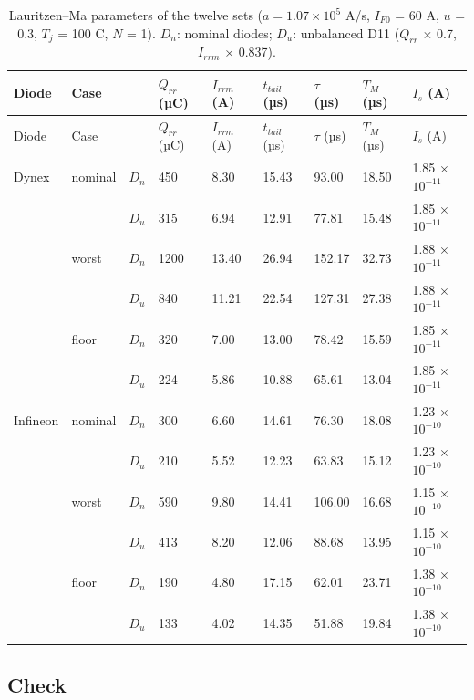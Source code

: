 \documentclass[11pt,a4paper,numbers=noenddot]{scrartcl}
\begin{document}
\begin{onehalfspace}
{\small\singlespacing
\begin{longtable}[]{@{}lllllllll@{}}
\caption{Lauritzen--Ma parameters of the twelve sets (\(a = 1.07 \times 10^5\) A/s, \(I_{F0}\) = 60 A, \(u\) = 0.3, \(T_j\) = 100 \textdegree{}C, \(N\) = 1). \(D_n\): nominal diodes; \(D_u\): unbalanced D11 (\(Q_{rr}\) \(\times\) 0.7, \(I_{rrm}\) \(\times\) 0.837).}\tabularnewline
\toprule\noalign{}
Diode & Case & & \(Q_{rr}\) (µC) & \(I_{rrm}\) (A) & \(t_{tail}\) (µs) & \(\tau\) (µs) & \(T_M\) (µs) & \(I_s\) (A) \\
\midrule\noalign{}
\endfirsthead
\toprule\noalign{}
Diode & Case & & \(Q_{rr}\) (µC) & \(I_{rrm}\) (A) & \(t_{tail}\) (µs) & \(\tau\) (µs) & \(T_M\) (µs) & \(I_s\) (A) \\
\midrule\noalign{}
\endhead
\bottomrule\noalign{}
\endlastfoot
Dynex & nominal & \(D_n\) & 450 & 8.30 & 15.43 & 93.00 & 18.50 & 1.85 \(\times\) \(10^{-11}\) \\
& & \(D_u\) & 315 & 6.94 & 12.91 & 77.81 & 15.48 & 1.85 \(\times\) \(10^{-11}\) \\
& worst & \(D_n\) & 1200 & 13.40 & 26.94 & 152.17 & 32.73 & 1.88 \(\times\) \(10^{-11}\) \\
& & \(D_u\) & 840 & 11.21 & 22.54 & 127.31 & 27.38 & 1.88 \(\times\) \(10^{-11}\) \\
& floor & \(D_n\) & 320 & 7.00 & 13.00 & 78.42 & 15.59 & 1.85 \(\times\) \(10^{-11}\) \\
& & \(D_u\) & 224 & 5.86 & 10.88 & 65.61 & 13.04 & 1.85 \(\times\) \(10^{-11}\) \\
Infineon & nominal & \(D_n\) & 300 & 6.60 & 14.61 & 76.30 & 18.08 & 1.23 \(\times\) \(10^{-10}\) \\
& & \(D_u\) & 210 & 5.52 & 12.23 & 63.83 & 15.12 & 1.23 \(\times\) \(10^{-10}\) \\
& worst & \(D_n\) & 590 & 9.80 & 14.41 & 106.00 & 16.68 & 1.15 \(\times\) \(10^{-10}\) \\
& & \(D_u\) & 413 & 8.20 & 12.06 & 88.68 & 13.95 & 1.15 \(\times\) \(10^{-10}\) \\
& floor & \(D_n\) & 190 & 4.80 & 17.15 & 62.01 & 23.71 & 1.38 \(\times\) \(10^{-10}\) \\
& & \(D_u\) & 133 & 4.02 & 14.35 & 51.88 & 19.84 & 1.38 \(\times\) \(10^{-10}\) \\
\end{longtable}
}

\subsection{Check}\label{check}


\end{onehalfspace}
\end{document}
